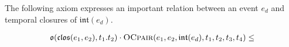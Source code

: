 The following axiom expresses an important relation between an event $e_d$ and temporal closures of $\mathfrak{int}(e_d)$.

\begin{axiom}
	\begin{equation}
		\begin{gathered}
			\mathfrak{o}(\mathfrak{clos}(e_1, e_2), t_1. t_2) \cdot \textsc{OCpair}(e_1, e_2, \mathfrak{int}(e_d), t_1, t_2, t_3, t_4) \leq \\
		\end{gathered}
	\end{equation}
\end{axiom}